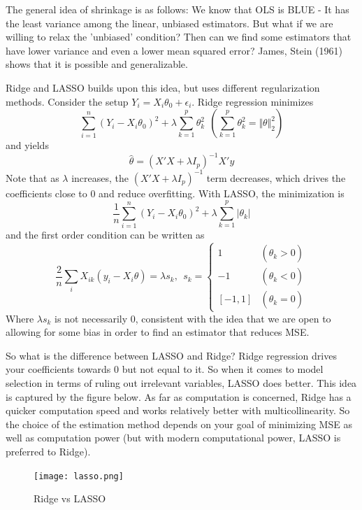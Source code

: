 The general idea of shrinkage is as follows: We know that OLS is BLUE - It has the least variance among the linear, unbiased estimators. But what if we are willing to relax the 'unbiased' condition? Then can we find some estimators that have lower variance and even a lower mean squared error? James, Stein (1961) shows that it is possible and generalizable. \par 
Ridge and LASSO builds upon this idea, but uses different regularization methods. Consider the setup $Y_i=X_i\theta_0+\epsilon_i$. Ridge regression minimizes
\[
\sum_{i=1}^n(Y_i-X_i\theta_0)^2+\lambda\sum_{k=1}^p \theta_k^2 \ \ \left(\sum_{k=1}^p \theta_k^2=\Vert \theta\Vert_2^2\right)
\]
and yields
\[
\hat{\theta} = (X'X+\lambda I_p)^{-1}X'y
\]
Note that as $\lambda$ increases, the $(X'X+\lambda I_p)^{-1}$ term decreases, which drives the coefficients close to 0 and reduce overfitting. With LASSO, the minimization is 
\[
\frac{1}{n}\sum_{i=1}^n(Y_i-X_i\theta_0)^2+\lambda\sum_{k=1}^p |\theta_k| 
\]
and the first order condition can be written as
\[
\frac{2}{n}\sum_i X_{ik}(y_i-X_i\theta)=\lambda s_k, \ \ s_k = \begin{cases}1 & (\hat{\theta}_k>0) \\ -1 & (\hat{\theta}_k<0)\\ [-1,1] & (\hat{\theta}_k=0)\end{cases}
\]
Where $\lambda s_k$ is not necessarily 0, consistent with the idea that we are open to allowing for some bias in order to find an estimator that reduces MSE. 
\par So what is the difference between LASSO and Ridge? Ridge regression drives your coefficients towards 0 but not equal to it. So when it comes to model selection in terms of ruling out irrelevant variables, LASSO does better. This idea is captured by the figure below. As far as computation is concerned, Ridge has a quicker computation speed and works relatively better with multicollinearity.  So the choice of the estimation method depends on your goal of minimizing MSE as well as computation power (but with modern computational power, LASSO is preferred to Ridge). 
\begin{figure}[H]
\centering
\texttt{[image: lasso.png]}
\caption{Ridge vs LASSO}
\end{figure}
